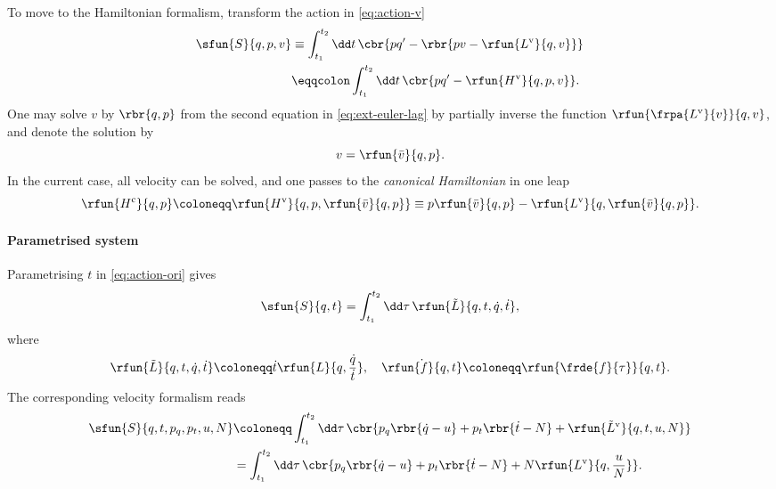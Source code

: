 To move to the Hamiltonian formalism, transform the action in 
\cref{eq:action-v}
\begin{align}
\sfun{S}{q, p, v} &\equiv \int_{t_1}^{t_2}\dd t\,\cbr{pq' - 
\rbr{pv-\rfun{L^\text{v}}{q, v}}} \nonumber \\
&\eqqcolon \int_{t_1}^{t_2}\dd t\,\cbr{pq' - \rfun{H^\text{v}}{q, p, v}}.
\end{align}
One may solve $v$ by $\rbr{q, p}$ from the second equation in 
\cref{eq:ext-euler-lag} by partially inverse the function 
$\rfun{\frpa{L^\text{v}}{v}}{q, v}$, and denote the solution by
\begin{equation}
v = \rfun{\bar v}{q, p}.
\label{eq:v-bar-v}
\end{equation}
In the current case, all velocity can be solved, and one passes to the 
\emph{canonical Hamiltonian} in one leap
\begin{equation}
\rfun{H^\text{c}}{q, p} \coloneqq %
\rfun{H^\text{v}}{q, p, \rfun{\bar v}{q, p}} \equiv
p\rfun{\bar v}{q, p} - \rfun{L^\text{v}}{q, \rfun{\bar v}{q, p}}.
\label{eq:H^c}
\end{equation}

\paragraph{Parametrised system}

Parametrising $t$ in \cref{eq:action-ori} gives
\begin{equation}
\sfun{S}{q, t} = \int_{t_1}^{t_2} \dd \tau\,\rfun{\tilde L}{q, t, \dot 
q, \dot t},
\end{equation}
where
\begin{equation}
\rfun{\tilde L}{q, t, \dot q, \dot t} \coloneqq \dot t \rfun{L}{q, 
\frac{\dot q}{\dot t}},\quad
\dot \rfun{f}{q,t} \coloneqq \rfun{\frde{f}{\tau}}{q,t}.
\end{equation}
The corresponding velocity formalism reads
\begin{align}
\sfun{S}{q, t, p_q, p_t, u, N} &\coloneqq \int_{t_1}^{t_2}\dd \tau\,
\cbr{p_q\rbr{\dot q-u}+p_t\rbr{\dot t-N} +
\rfun{\tilde L^\text{v}}{q, t, u, N}} \nonumber \\
&=\int_{t_1}^{t_2}\dd \tau\,
\cbr{p_q\rbr{\dot q-u}+p_t\rbr{\dot t-N} +
N \rfun{L^\text{v}}{q, \frac{u}{N}}}.
\label{eq:action-Nu}
\end{align}

